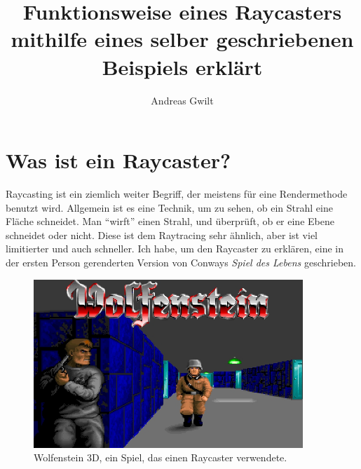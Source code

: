 \documentclass[a4paper,12pt]{report}
\title{Funktionsweise eines Raycasters mithilfe eines selber geschriebenen Beispiels erkl\"art}
\author{Andreas Gwilt}
\begin{document}
\maketitle
\tableofcontents

\chapter{Was ist ein Raycaster?}
Raycasting ist ein ziemlich weiter Begriff, der meistens für eine Rendermethode benutzt wird. Allgemein ist es eine Technik, um zu sehen, ob ein Strahl eine Fläche schneidet. Man ``wirft'' einen Strahl, und überprüft, ob er eine Ebene schneidet oder nicht. Diese ist dem Raytracing sehr ähnlich, aber ist viel limitierter und auch schneller.
Ich habe, um den Raycaster zu erklären, eine in der ersten Person gerenderten Version von Conways \textit{Spiel des Lebens} geschrieben. 

\begin{figure}[htbp] 
        \centering
        \includegraphics[width=4in]{wolfenstein-cover.jpg} 
        \caption{Wolfenstein 3D, ein Spiel, das einen Raycaster verwendete.}
\end{figure}
\end{document}
